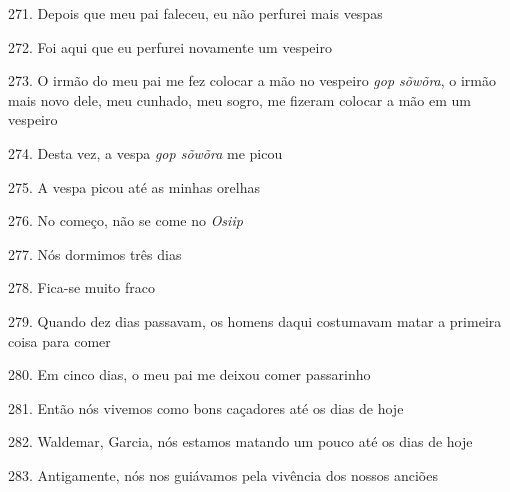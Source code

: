 271. Depois que meu pai faleceu, eu não perfurei mais vespas

272. Foi aqui que eu perfurei novamente um vespeiro

273. O irmão do meu pai me fez colocar a mão no vespeiro \emph{gop
sõwõra}, o irmão mais novo dele, meu cunhado, meu sogro, me fizeram
colocar a mão em um vespeiro

274. Desta vez, a vespa \emph{gop sõwõra} me picou

275. A vespa picou até as minhas orelhas

276. No começo, não se come no \emph{Osiip}

277. Nós dormimos três dias

278. Fica-se muito fraco

279. Quando dez dias passavam, os homens daqui costumavam matar a
primeira coisa para comer

280. Em cinco dias, o meu pai me deixou comer passarinho

281. Então nós vivemos como bons caçadores até os dias de hoje

282. Waldemar, Garcia, nós estamos matando um pouco até os dias de hoje

283. Antigamente, nós nos guiávamos pela vivência dos nossos anciões